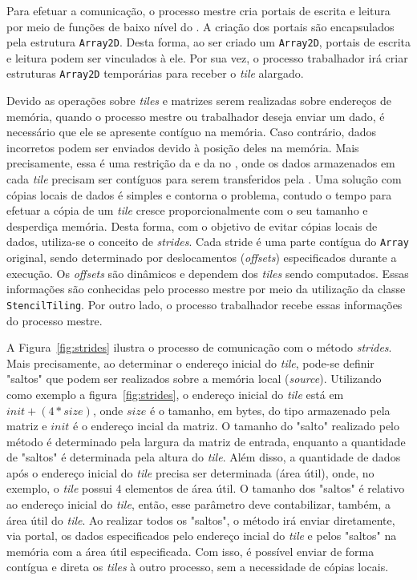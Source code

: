 Para efetuar a comunicação, o processo mestre cria portais de escrita e leitura
por meio de funções de baixo nível do \mppa. A criação dos portais são encapsulados pela
estrutura \texttt{Array2D}. Desta forma, ao ser criado um \texttt{Array2D},
portais de escrita e leitura podem ser vinculados à ele. Por sua vez, o
processo trabalhador irá criar estruturas \texttt{Array2D} temporárias para
receber o \textit{tile} alargado.

Devido as operações sobre \textit{tiles} e matrizes serem realizadas sobre
endereços de memória, quando o processo mestre ou trabalhador deseja enviar um
dado, é necessário que ele se apresente contíguo na memória. Caso contrário,
dados incorretos podem ser enviados devido à posição deles na memória. Mais
precisamente, essa é uma restrição da \api e da \noc no \mppa, onde os dados
armazenados em cada \textit{tile} precisam ser contíguos para serem transferidos
pela \noc. Uma solução com cópias locais de dados é simples e contorna o
problema, contudo o tempo para efetuar a cópia de um \textit{tile} cresce
proporcionalmente com o seu tamanho e desperdiça memória. Desta forma, com o
objetivo de evitar cópias locais de dados, utiliza-se o conceito de
\textit{strides}. Cada stride é uma parte contígua do \texttt{Array} original,
sendo determinado por deslocamentos (\textit{offsets}) especificados durante a
execução. Os \textit{offsets} são dinâmicos e dependem dos \textit{tiles} sendo
computados. Essas informações são conhecidas pelo processo mestre
por meio da utilização da classe \texttt{StencilTiling}. Por outro lado, o
processo trabalhador recebe essas informações do processo mestre.

A Figura~\ref{fig:strides} ilustra o processo de comunicação com o método
\textit{strides}. Mais precisamente, ao determinar o endereço inicial do
\textit{tile}, pode-se definir "saltos"{} que podem ser realizados sobre a
memória local (\textit{source}). Utilizando como exemplo a figura~\ref{fig:strides}, o endereço inicial
do \textit{tile} está em $init+(4 * size)$, onde $size$ é o tamanho, em bytes,
do tipo armazenado pela matriz e $init$ é o endereço incial da matriz. O tamanho
do "salto"{} realizado pelo método é determinado pela largura da matriz de
entrada, enquanto a quantidade de "saltos"{} é determinada pela altura do
\textit{tile}. Além disso, a quantidade de dados após o endereço inicial do
\textit{tile} precisa ser determinada (\ie área útil), onde, no exemplo, o
\textit{tile} possui $4$ elementos de área útil. O tamanho dos "saltos"{} é
relativo ao endereço inicial do \textit{tile}, então, esse parâmetro deve
contabilizar, também, a área útil do \textit{tile}. Ao realizar todos os
"saltos"{}, o método irá enviar diretamente, via portal, os dados especificados
pelo endereço incial do \textit{tile} e pelos "saltos"{} na memória com a área útil
especificada. Com isso, é possível enviar de forma contígua e direta os
\textit{tiles} à outro processo, sem a necessidade de cópias locais.

